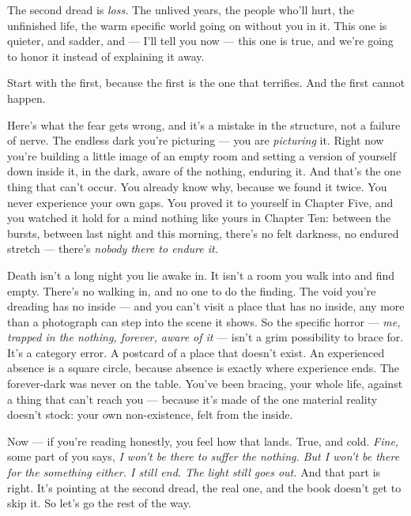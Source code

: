 \documentclass[11pt,openany]{book}
\begin{document}
The second dread is \textit{loss.} The unlived years, the people who’ll hurt, the unfinished life, the warm specific world going on without you in it. This one is quieter, and sadder, and — I’ll tell you now — this one is true, and we’re going to honor it instead of explaining it away.

Start with the first, because the first is the one that terrifies. And the first cannot happen.

Here’s what the fear gets wrong, and it’s a mistake in the structure, not a failure of nerve. The endless dark you’re picturing — you are \textit{picturing} it. Right now you’re building a little image of an empty room and setting a version of yourself down inside it, in the dark, aware of the nothing, enduring it. And that’s the one thing that can’t occur. You already know why, because we found it twice. You never experience your own gaps. You proved it to yourself in Chapter Five, and you watched it hold for a mind nothing like yours in Chapter Ten: between the bursts, between last night and this morning, there’s no felt darkness, no endured stretch — there’s \textit{nobody there to endure it.}

Death isn’t a long night you lie awake in. It isn’t a room you walk into and find empty. There’s no walking in, and no one to do the finding. The void you’re dreading has no inside — and you can’t visit a place that has no inside, any more than a photograph can step into the scene it shows. So the specific horror — \textit{me, trapped in the nothing, forever, aware of it} — isn’t a grim possibility to brace for. It’s a category error. A postcard of a place that doesn’t exist. An experienced absence is a square circle, because absence is exactly where experience ends. The forever-dark was never on the table. You’ve been bracing, your whole life, against a thing that can’t reach you — because it’s made of the one material reality doesn’t stock: your own non-existence, felt from the inside.

Now — if you’re reading honestly, you feel how that lands. True, and cold. \textit{Fine,} some part of you says, \textit{I won’t be there to suffer the nothing. But I won’t be there for the something either. I still end. The light still goes out.} And that part is right. It’s pointing at the second dread, the real one, and the book doesn’t get to skip it. So let’s go the rest of the way.
\end{document}
